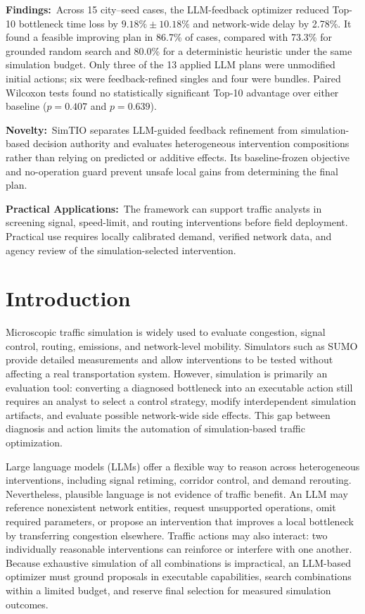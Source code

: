 \documentclass{trbunofficial}
\begin{document}
\hfill\break%
\noindent\textbf{Findings:}~Across 15 city--seed cases, the LLM-feedback
optimizer reduced Top-10 bottleneck time loss by
$9.18\%\pm10.18\%$ and network-wide delay by 2.78\%. It found a feasible
improving plan in 86.7\% of cases, compared with 73.3\% for grounded random
search and 80.0\% for a deterministic heuristic under the same simulation
budget. Only three of the 13 applied LLM plans were unmodified initial actions;
six were feedback-refined singles and four were bundles. Paired Wilcoxon tests
found no statistically significant Top-10 advantage over either baseline
($p=0.407$ and $p=0.639$).

\hfill\break%
\noindent\textbf{Novelty:}~SimTIO separates LLM-guided feedback refinement from
simulation-based decision authority and evaluates heterogeneous intervention
compositions rather than relying on predicted or additive effects. Its
baseline-frozen objective and no-operation guard prevent unsafe local gains
from determining the final plan.

\hfill\break%
\noindent\textbf{Practical Applications:}~The framework can support traffic
analysts in screening signal, speed-limit, and routing interventions before
field deployment. Practical use requires locally calibrated demand, verified
network data, and agency review of the simulation-selected intervention.

\newpage

\section{Introduction}
\label{sec:intro}

Microscopic traffic simulation is widely used to evaluate congestion, signal
control, routing, emissions, and network-level mobility.  Simulators such as
SUMO provide detailed measurements and allow interventions to be tested without
affecting a real transportation system.  However, simulation is primarily an
evaluation tool: converting a diagnosed bottleneck into an executable action
still requires an analyst to select a control strategy, modify interdependent
simulation artifacts, and evaluate possible network-wide side effects.  This
gap between diagnosis and action limits the automation of simulation-based
traffic optimization.

Large language models (LLMs) offer a flexible way to reason across heterogeneous
interventions, including signal retiming, corridor control, and demand
rerouting.  Nevertheless, plausible language is not evidence of traffic
benefit.  An LLM may reference nonexistent network entities, request unsupported
operations, omit required parameters, or propose an intervention that improves
a local bottleneck by transferring congestion elsewhere.  Traffic actions may
also interact: two individually reasonable interventions can reinforce or
interfere with one another.  Because exhaustive simulation of all combinations
is impractical, an LLM-based optimizer must ground proposals in executable
capabilities, search combinations within a limited budget, and reserve final
selection for measured simulation outcomes.
\end{document}
